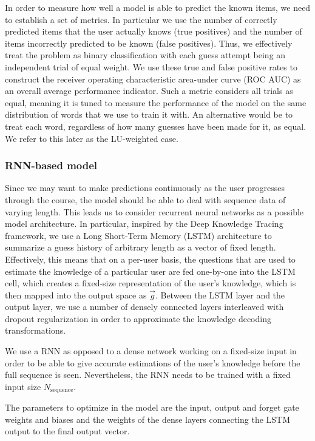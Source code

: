 In order to measure how well a model is able to predict the known items, we need to establish a set of metrics. In particular we use the number of correctly predicted items that the user actually knows (true positives) and the number of items incorrectly predicted to be known (false positives). Thus, we effectively treat the problem as binary classification with each guess attempt being an independent trial of equal weight. 
We use these true and false positive rates to construct the receiver operating characteristic area-under curve (ROC AUC) as an overall average performance indicator. Such a metric considers all trials as equal, meaning it is tuned to measure the performance of the model on the same distribution of words that we use to train it with. An alternative would be to treat each word, regardless of how many guesses have been made for it, as equal. We refer to this later as the LU-weighted case.

\subsubsection{RNN-based model}
Since we may want to make predictions continuously as the user progresses through the course, the model should be able to deal with sequence data of varying length. This leads us to consider recurrent neural networks as a possible model architecture. In particular, inspired by the Deep Knowledge Tracing framework\cite{DBLP:journals/corr/PiechSHGSGS15}, we use a Long Short-Term Memory (LSTM)\cite{gers1999learning} architecture to summarize a guess history of arbitrary length as a vector of fixed length. Effectively, this means that on a per-user basis, the questions that are used to estimate the knowledge of a particular user are fed one-by-one into the LSTM cell, which creates a fixed-size representation of the user's knowledge, which is then mapped into the output space as $\vec{g}$. Between the LSTM layer and the output layer, we use a number of densely connected layers interleaved with dropout regularization in order to approximate the knowledge decoding transformations.

We use a RNN as opposed to a dense network working on a fixed-size input in order to be able to give accurate estimations of the user's knowledge before the full sequence is seen. Nevertheless, the RNN needs to be trained with a fixed input size $N_{\mathrm{sequence}}$.

The parameters to optimize in the model are the input, output and forget gate weights and biases and the weights of the dense layers connecting the LSTM output to the final output vector.

